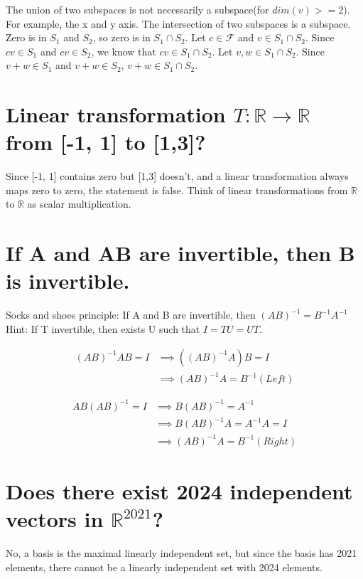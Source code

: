 \documentclass[12pt, letterpaper, twoside]{article}
\newcommand{\inv}{^{-1}}
\begin{document}
The union of two subspaces is not necessarily a subspace(for $dim(v) >= 2$).
For example, the x and y axis.
The intersection of two subspaces is a subspace.
Zero is in $S_1$ and $S_2$, so zero is in $S_1 \cap S_2$.
Let $c \in \mathcal{F}$ and $v \in S_1 \cap S_2$.
Since $cv \in S_1$ and $cv \in S_2$, we know that
$cv \in S_1 \cap S_2$.
Let $v,w \in S_1 \cap S_2$.
Since $v+w \in S_1$ and $v+w \in S_2$,
$v+w \in S_1 \cap S_2$.

\section{Linear transformation $T: \mathbb{R} \rightarrow \mathbb{R}$ from [-1, 1] to [1,3]?}

Since [-1, 1] contains zero but [1,3] doesn't,
and a linear transformation always maps zero to zero,
the statement is false.
Think of linear transformations from $\mathbb{R}$ to $\mathbb{R}$
as scalar multiplication.

\section{If A and AB are invertible, then B is invertible.}

Socks and shoes principle: 
If A and B are invertible, then $(AB)\inv = B\inv A\inv$
Hint: If T invertible, then exists U such that $I = TU = UT$.

\begin{align}
    (AB) \inv AB = I 
    &\implies ((AB) \inv A)B = I \\
    &\implies (AB)\inv A = B\inv (Left)
\end{align}

\begin{align}
    AB(AB)\inv = I
    &\implies B (AB)\inv = A\inv \\
    &\implies B (AB)\inv A = A\inv A = I \\
    &\implies (AB)\inv A = B\inv (Right) 
\end{align}



\section{Does there exist 2024 independent vectors in $\mathbb{R}^{2021}$?}

No, a basis is the maximal linearly independent set, 
but since the basis has 2021 elements,
there cannot be a linearly independent set with 2024 elements.
\end{document}
